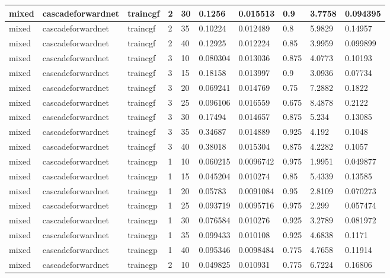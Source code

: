 \begin{longtable}{lllllllll}
mixed & cascadeforwardnet & traincgf & 2 & 30 & 0.1256 & 0.015513 & 0.9 & 3.7758 & 0.094395 \\ \hline 
mixed & cascadeforwardnet & traincgf & 2 & 35 & 0.10224 & 0.012489 & 0.8 & 5.9829 & 0.14957 \\ \hline 
mixed & cascadeforwardnet & traincgf & 2 & 40 & 0.12925 & 0.012224 & 0.85 & 3.9959 & 0.099899 \\ \hline 
mixed & cascadeforwardnet & traincgf & 3 & 10 & 0.080304 & 0.013036 & 0.875 & 4.0773 & 0.10193 \\ \hline 
mixed & cascadeforwardnet & traincgf & 3 & 15 & 0.18158 & 0.013997 & 0.9 & 3.0936 & 0.07734 \\ \hline 
mixed & cascadeforwardnet & traincgf & 3 & 20 & 0.069241 & 0.014769 & 0.75 & 7.2882 & 0.1822 \\ \hline 
mixed & cascadeforwardnet & traincgf & 3 & 25 & 0.096106 & 0.016559 & 0.675 & 8.4878 & 0.2122 \\ \hline 
mixed & cascadeforwardnet & traincgf & 3 & 30 & 0.17494 & 0.014657 & 0.875 & 5.234 & 0.13085 \\ \hline 
mixed & cascadeforwardnet & traincgf & 3 & 35 & 0.34687 & 0.014889 & 0.925 & 4.192 & 0.1048 \\ \hline 
mixed & cascadeforwardnet & traincgf & 3 & 40 & 0.38018 & 0.015304 & 0.875 & 4.2282 & 0.1057 \\ \hline 
mixed & cascadeforwardnet & traincgp & 1 & 10 & 0.060215 & 0.0096742 & 0.975 & 1.9951 & 0.049877 \\ \hline 
mixed & cascadeforwardnet & traincgp & 1 & 15 & 0.045204 & 0.010274 & 0.85 & 5.4339 & 0.13585 \\ \hline 
mixed & cascadeforwardnet & traincgp & 1 & 20 & 0.05783 & 0.0091084 & 0.95 & 2.8109 & 0.070273 \\ \hline 
mixed & cascadeforwardnet & traincgp & 1 & 25 & 0.093719 & 0.0095716 & 0.975 & 2.299 & 0.057474 \\ \hline 
mixed & cascadeforwardnet & traincgp & 1 & 30 & 0.076584 & 0.010276 & 0.925 & 3.2789 & 0.081972 \\ \hline 
mixed & cascadeforwardnet & traincgp & 1 & 35 & 0.099433 & 0.010108 & 0.925 & 4.6838 & 0.1171 \\ \hline 
mixed & cascadeforwardnet & traincgp & 1 & 40 & 0.095346 & 0.0098484 & 0.775 & 4.7658 & 0.11914 \\ \hline 
mixed & cascadeforwardnet & traincgp & 2 & 10 & 0.049825 & 0.010931 & 0.775 & 6.7224 & 0.16806 \\ \hline 

\end{longtable}
